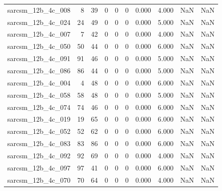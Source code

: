 \documentclass{article}
\begin{document}
\begin{longtable}{lrrrrrrrrr}
sarcsm\_12b\_4c\_008 & 8 & 39 & 0 & 0 & 0 & 0.000 & 4.000 & NaN & NaN \\
sarcsm\_12b\_4c\_024 & 24 & 49 & 0 & 0 & 0 & 0.000 & 5.000 & NaN & NaN \\
sarcsm\_12b\_4c\_007 & 7 & 42 & 0 & 0 & 0 & 0.000 & 4.000 & NaN & NaN \\
sarcsm\_12b\_4c\_050 & 50 & 44 & 0 & 0 & 0 & 0.000 & 6.000 & NaN & NaN \\
sarcsm\_12b\_4c\_091 & 91 & 46 & 0 & 0 & 0 & 0.000 & 5.000 & NaN & NaN \\
sarcsm\_12b\_4c\_086 & 86 & 44 & 0 & 0 & 0 & 0.000 & 5.000 & NaN & NaN \\
sarcsm\_12b\_4c\_004 & 4 & 48 & 0 & 0 & 0 & 0.000 & 6.000 & NaN & NaN \\
sarcsm\_12b\_4c\_058 & 58 & 48 & 0 & 0 & 0 & 0.000 & 5.000 & NaN & NaN \\
sarcsm\_12b\_4c\_074 & 74 & 46 & 0 & 0 & 0 & 0.000 & 6.000 & NaN & NaN \\
sarcsm\_12b\_4c\_019 & 19 & 65 & 0 & 0 & 0 & 0.000 & 6.000 & NaN & NaN \\
sarcsm\_12b\_4c\_052 & 52 & 62 & 0 & 0 & 0 & 0.000 & 6.000 & NaN & NaN \\
sarcsm\_12b\_4c\_083 & 83 & 86 & 0 & 0 & 0 & 0.000 & 6.000 & NaN & NaN \\
sarcsm\_12b\_4c\_092 & 92 & 69 & 0 & 0 & 0 & 0.000 & 4.000 & NaN & NaN \\
sarcsm\_12b\_4c\_097 & 97 & 41 & 0 & 0 & 0 & 0.000 & 6.000 & NaN & NaN \\
sarcsm\_12b\_4c\_070 & 70 & 64 & 0 & 0 & 0 & 0.000 & 4.000 & NaN & NaN \\
\end{longtable}
\end{document}
